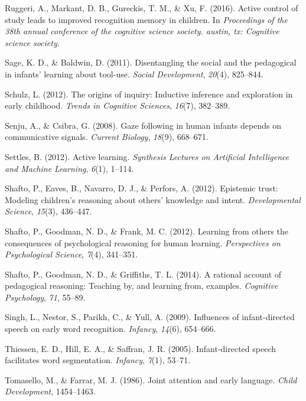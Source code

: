 \documentclass[a4paper,man,apacite,floatsintext]{apa6}
\begin{document}
\hypertarget{ref-ruggeri2016active}{}
Ruggeri, A., Markant, D. B., Gureckis, T. M., \& Xu, F. (2016). Active
control of study leads to improved recognition memory in children. In
\emph{Proceedings of the 38th annual conference of the cognitive science
society. austin, tx: Cognitive science society}.

\hypertarget{ref-sage2011disentangling}{}
Sage, K. D., \& Baldwin, D. (2011). Disentangling the social and the
pedagogical in infants' learning about tool-use. \emph{Social
Development}, \emph{20}(4), 825--844.

\hypertarget{ref-schulz2012origins}{}
Schulz, L. (2012). The origins of inquiry: Inductive inference and
exploration in early childhood. \emph{Trends in Cognitive Sciences},
\emph{16}(7), 382--389.

\hypertarget{ref-senju2008gaze}{}
Senju, A., \& Csibra, G. (2008). Gaze following in human infants depends
on communicative signals. \emph{Current Biology}, \emph{18}(9),
668--671.

\hypertarget{ref-settles2012active}{}
Settles, B. (2012). Active learning. \emph{Synthesis Lectures on
Artificial Intelligence and Machine Learning}, \emph{6}(1), 1--114.

\hypertarget{ref-shafto2012epistemic}{}
Shafto, P., Eaves, B., Navarro, D. J., \& Perfors, A. (2012). Epistemic
trust: Modeling children's reasoning about others' knowledge and intent.
\emph{Developmental Science}, \emph{15}(3), 436--447.

\hypertarget{ref-shafto2012learning}{}
Shafto, P., Goodman, N. D., \& Frank, M. C. (2012). Learning from others
the consequences of psychological reasoning for human learning.
\emph{Perspectives on Psychological Science}, \emph{7}(4), 341--351.

\hypertarget{ref-shafto2014rational}{}
Shafto, P., Goodman, N. D., \& Griffiths, T. L. (2014). A rational
account of pedagogical reasoning: Teaching by, and learning from,
examples. \emph{Cognitive Psychology}, \emph{71}, 55--89.

\hypertarget{ref-singh2009influences}{}
Singh, L., Nestor, S., Parikh, C., \& Yull, A. (2009). Influences of
infant-directed speech on early word recognition. \emph{Infancy},
\emph{14}(6), 654--666.

\hypertarget{ref-thiessen2005infant}{}
Thiessen, E. D., Hill, E. A., \& Saffran, J. R. (2005). Infant-directed
speech facilitates word segmentation. \emph{Infancy}, \emph{7}(1),
53--71.

\hypertarget{ref-tomasello1986joint}{}
Tomasello, M., \& Farrar, M. J. (1986). Joint attention and early
language. \emph{Child Development}, 1454--1463.
\end{document}

